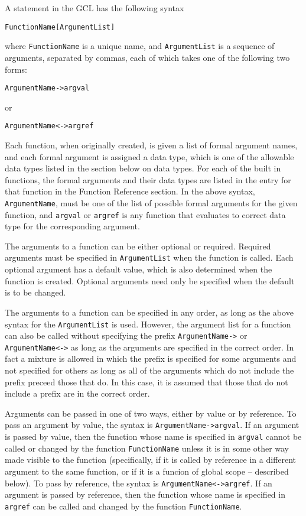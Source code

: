 A statement in the GCL has the
following syntax
\begin{verbatim}
FunctionName[ArgumentList]
\end{verbatim}
where \verb+FunctionName+ is a unique name, and \verb+ArgumentList+ is
a sequence of arguments, separated by commas, each of which takes one
of the following two forms:
\begin{verbatim}
ArgumentName->argval
\end{verbatim}
or
\begin{verbatim}
ArgumentName<->argref
\end{verbatim}

Each function, when originally created, is given a list of formal
argument names, and each formal argument is assigned a data type,
which is one of the allowable data types listed in the section below
on data types.  For each of the built in functions, the formal
arguments and their data types are listed in the entry for that
function in the Function Reference section.  In the above syntax,
\verb+ArgumentName+, must be one of the list of possible formal
arguments for the given function, and \verb+argval+ or \verb+argref+
is any function that evaluates to correct data type for the
corresponding argument. 

The arguments to a function can be either optional or required.
Required arguments must be specified in \verb+ArgumentList+ when the
function is called.  Each optional argument has a default value, which
is also determined when the function is created.  Optional arguments
need only be specified when the default is to be changed.

The arguments to a function can be specified in any order, as long as
the above syntax for the \verb+ArgumentList+ is used.  However, the
argument list for a function can also be called without specifying the 
prefix \verb+ArgumentName->+ or \verb+ArgumentName<->+ as long as the 
arguments are specified in the correct order.  In fact a mixture is 
allowed in which the prefix is specified for some arguments and not
specified for others as long as all of the arguments which do not
include the prefix preceed those that do.  In this case, it is assumed
that those that do not include a prefix are in the correct order.  

Arguments can be passed in one of two ways, either by value or by
reference.  To pass an argument by value, the syntax is
\verb+ArgumentName->argval+.  If an argument is passed by value, then the
function whose name is specified in \verb+argval+ cannot be called
or changed by the function \verb+FunctionName+ unless it is in some
other way made visible to the function (specifically, if it is called
by reference in a different argument to the same function, or if it is a
funcion of global scope -- described below).  To pass by reference,
the syntax is \verb+ArgumentName<->argref+.  If an argument is passed
by reference, then the function whose name is specified in
\verb+argref+ can be called and changed by the function
\verb+FunctionName+.  

